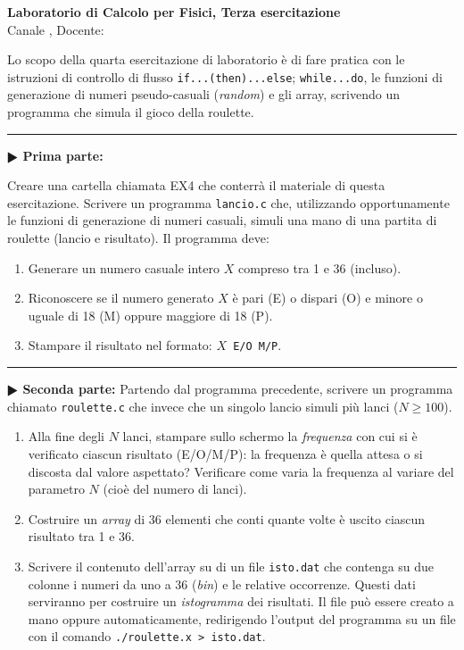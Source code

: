 \documentclass[11pt]{article}
\begin{document}
\pagestyle{empty}

\begin{center}
{\Large \bf  Laboratorio di Calcolo per Fisici, Terza esercitazione\\[2mm]}
{\large Canale \canale, Docente: \docente}
\end{center}
\vspace{4mm}

\begin{mdframed}[backgroundcolor=panna]
  Lo scopo della quarta esercitazione di laboratorio \`e di fare pratica con
  le istruzioni di controllo di flusso \texttt{if...(then)...else}; \texttt{while...do}, le funzioni di generazione di numeri pseudo-casuali (\textit{random}) e gli array, scrivendo un programma che simula il gioco della roulette.
  \end{mdframed}
%
%



\hrule
\vspace{2mm}
\textbf{$\RHD$ Prima parte:}

Creare una cartella  chiamata EX4 che conterr\`{a} il materiale di questa esercitazione.
Scrivere un programma \texttt{lancio.c} che, utilizzando opportunamente le
funzioni di generazione di numeri casuali, simuli una mano di una partita di
roulette (lancio e risultato). Il programma deve:
\begin{enumerate}
\item Generare un numero casuale intero $X$ compreso tra 1 e 36 (incluso).
\item Riconoscere se il numero generato $X$ \`e pari (E) o dispari (O) e minore
o uguale di 18 (M) oppure maggiore di 18 (P).
\item Stampare il risultato nel formato: \texttt{$X$ E/O M/P}.
\end{enumerate}

\hrule
\vspace{2mm}
\textbf{$\RHD$ Seconda parte:}
Partendo dal programma precedente, scrivere un programma chiamato \texttt{roulette.c} che
invece che un singolo lancio simuli pi\`u lanci ($N \ge 100$).
\begin{enumerate}
\item Alla fine degli $N$ lanci, stampare sullo schermo la {\em frequenza\/}
con cui si \`e verificato ciascun risultato (E/O/M/P): la frequenza
\`e quella attesa o si discosta dal valore aspettato? Verificare come
varia la frequenza al variare del parametro $N$ (cioè del numero di lanci).
\item Costruire un {\em array\/} di 36 elementi che conti quante volte è uscito ciascun risultato tra 1 e 36.
\item Scrivere il contenuto dell'array su di un file
  \texttt{isto.dat} che contenga
su due colonne i numeri da uno a 36 ({\em bin\/}) e le relative occorrenze.
Questi dati serviranno per costruire un {\em istogramma\/} dei risultati.
Il file pu\`o essere creato a mano oppure automaticamente, redirigendo l'output del programma
su un file con il comando \texttt{./roulette.x > isto.dat}.
\end{enumerate}
\end{document}
